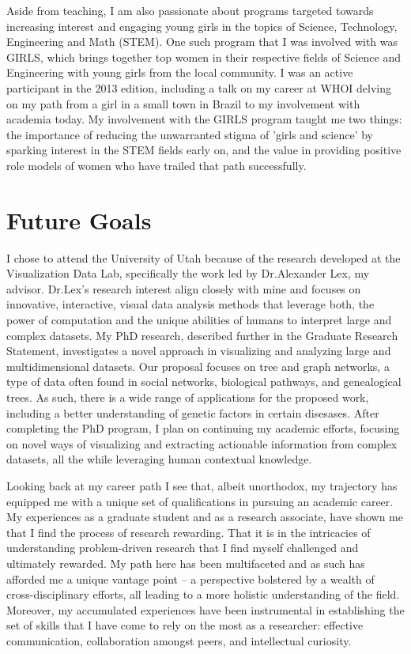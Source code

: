\documentclass[timesfont,runinheadings]{nsfgrfp}
\begin{document}
Aside from teaching, I am also passionate about programs targeted towards increasing interest and engaging young girls in the topics of Science, Technology, Engineering and Math (STEM).  One such program that I was involved with was GIRLS, which brings together top women in their respective fields of Science and Engineering with young girls from the local community. I was an active participant in the 2013 edition, including a talk on my career at WHOI delving on my path from a girl in a small town in Brazil to my involvement with academia today. My involvement with the GIRLS program taught me two things: the importance of reducing the unwarranted stigma of 'girls and science' by sparking interest in the STEM fields early on, and the value in providing positive role models of women who have trailed that path successfully.  

\section*{Future Goals } 
I chose to attend the University of Utah because of the research developed at the Visualization Data Lab, specifically the work led by Dr.Alexander Lex, my advisor. Dr.Lex's research interest align closely with mine and focuses on innovative, interactive, visual data analysis methods that leverage both, the power of computation and the unique abilities of humans to interpret large and complex datasets. My PhD research, described further in the Graduate Research Statement, investigates a novel approach in visualizing and analyzing large and multidimensional datasets. Our proposal focuses on tree and graph networks, a type of data often found in social networks,  biological pathways, and genealogical trees. As such, there is a wide range of applications for the proposed work, including a better understanding of genetic factors in certain disesases. After completing the PhD program, I plan on continuing my academic efforts, focusing on novel ways of visualizing and extracting actionable information from complex datasets, all the while leveraging human contextual knowledge.

Looking back at my career path I see that, albeit unorthodox, my trajectory has equipped me with a unique set of qualifications in pursuing an academic career. My experiences as a graduate student and as a research associate, have shown me that I find the process of research rewarding. That it is in the intricacies of understanding problem-driven research that I find myself challenged and ultimately rewarded. My path here has been multifaceted and as such has afforded me a unique vantage point – a perspective bolstered by a wealth of cross-disciplinary efforts, all leading to a more holistic understanding of the field. Moreover, my accumulated experiences have been instrumental in establishing the set of skills that I have come to rely on the most as a researcher: effective communication, collaboration amongst peers, and intellectual curiosity.
\end{document}
